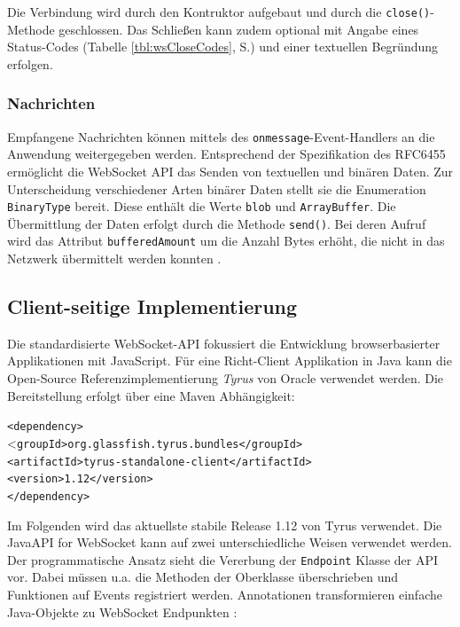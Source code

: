 \documentclass[11pt,a4paper,titlepage]{scrartcl}
\numberwithin{equation}{section}
\begin{document}
\noindent Die Verbindung wird durch den Kontruktor aufgebaut und durch die \texttt{close()}-Methode geschlossen. Das Schließen kann zudem optional mit Angabe eines Status-Codes (Tabelle \ref{tbl:wsCloseCodes}, S.\pageref{tbl:wsCloseCodes}) und einer textuellen Begründung erfolgen.

\subsubsection{Nachrichten}
Empfangene Nachrichten können mittels des \texttt{onmessage}-Event-Handlers an die Anwendung weitergegeben werden. Entsprechend der Spezifikation des RFC6455 ermöglicht die WebSocket API das Senden von textuellen und binären Daten. Zur Unterscheidung verschiedener Arten binärer Daten stellt sie die Enumeration \texttt{BinaryType} bereit. Diese enthält die Werte \texttt{blob} und \texttt{ArrayBuffer}. Die Übermittlung der Daten erfolgt durch die Methode \texttt{send()}. Bei deren Aufruf wird das Attribut \texttt{bufferedAmount} um die Anzahl Bytes erhöht, die nicht in das Netzwerk übermittelt werden konnten \autocite{whatwg_html_2010}.

\subsection{Client-seitige Implementierung}
Die standardisierte WebSocket-API fokussiert die Entwicklung browserbasierter Applikationen mit JavaScript. Für eine Richt-Client Applikation in Java kann die Open-Source Referenzimplementierung \textit{Tyrus} von Oracle verwendet werden. Die Bereitstellung erfolgt über eine Maven Abhängigkeit: 
\vspace{-4mm}
\begin{center}\parbox{0pt}{
	\begin{tabbing}
		\texttt{<depen}\=\texttt{dency>}\\
		\><\texttt{groupId>org.glassfish.tyrus.bundles</groupId>}\\
		\>\texttt{<artifactId>tyrus-standalone-client</artifactId>}\\
		\>\texttt{<version>1.12</version>}\\
		\texttt{</dependency>}
	\end{tabbing}}
\end{center}

\noindent Im Folgenden wird das aktuellste stabile Release 1.12 von Tyrus verwendet. Die Java\texttrademark API for WebSocket kann auf zwei unterschiedliche Weisen verwendet werden. Der programmatische Ansatz sieht die Vererbung der \texttt{Endpoint} Klasse der API vor. Dabei müssen u.a. die Methoden der Oberklasse überschrieben und Funktionen auf Events registriert werden. Annotationen transformieren einfache Java-Objekte zu WebSocket Endpunkten \autocite[9]{coward_java_2014}:\\
\end{document}
